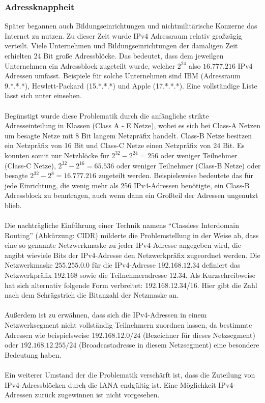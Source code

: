 \documentclass[a4paper,12pt]{scrartcl}
\begin{document}
\subsubsection{Adressknappheit}
Sp\"ater begannen auch Bildungseinrichtungen und nichtmilit\"arische Konzerne das Internet zu nutzen.
Zu dieser Zeit wurde IPv4 Adressraum relativ gro\ss{}z\"ugig verteilt. Viele Unternehmen und Bildungseinrichtungen der damaligen Zeit erhielten 24 Bit gro\ss{}e Adressbl\"ocke. Das bedeutet, dass dem jeweilgen Unternehmen ein Adressblock zugeteilt wurde, welcher $2^{24}$ also $16.777.216$ IPv4 Adressen umfasst. Beispiele f\"ur solche Unternehmen sind IBM (Adressraum 9.*.*.*), Hewlett-Packard (15.*.*.*) und Apple (17.*.*.*). Eine vollst\"andige Liste l\"asst sich unter \cite{ianaipv4list} einsehen.\\
\\
Beg\"unstigt wurde diese Problematik durch die anf\"angliche strikte Adresseinteilung in Klassen (Class A - E Netze), wobei es sich bei Class-A Netzen um besagte Netze mit 8 Bit langem Netzpr\"afix handelt. Class-B Netze besitzen ein Netzpr\"afix von 16 Bit und Class-C Netze einen Netzpr\"afix von 24 Bit. Es konnten somit nur Netzbl\"ocke f\"ur $2^{32} - 2^{24} = 256$ oder weniger Teilnehmer (Class-C Netze), $2^{32} - 2^{16} = 65.536$ oder weniger Teilnehmer (Class-B Netze) oder besagte $2^{32} - 2^{8} = 16.777.216$ zugeteilt werden. Beispielsweise bedeutete das f\"ur jede Einrichtung, die wenig mehr als 256 IPv4-Adressen ben\"otigte, ein Class-B Adressblock zu beantragen, auch wenn dann ein Gro\ss{}teil der Adressen ungenutzt blieb.\\
\\
Die nachtr\"agliche Einf\"uhrung einer Technik namens "`Classless Interdomain Routing"' (Abk\"urzung: CIDR) milderte die Problemstellung in der Weise ab, dass eine so genannte Netzwerkmaske zu jeder IPv4-Adresse angegeben wird, die angibt wieviele Bits der IPv4-Adresse den Netzwerkpr\"afix zugeordnet werden. Die Netzwerkmaske $255.255.0.0$ f\"ur die IPv4-Adresse $192.168.12.34$ definiert das Netzwerkpr\"afix $192.168$ sowie die Teilnehmeradresse $12.34$. Als Kurzschreibweise hat sich alternativ folgende Form verbreitet: 192.168.12.34/16. Hier gibt die Zahl nach dem Schr\"agstrich die Bitanzahl der Netzmaske an.\\
\\
Au\ss{}erdem ist zu erw\"ahnen, dass sich die IPv4-Adressen in einem Netzwerksegment nicht vollst\"andig Teilnehmern zuordnen lassen, da bestimmte Adressen wie beispielsweise $192.168.12.0/24$ (Bezeichner f\"ur dieses Netzsegment) oder $192.168.12.255/24$ (Broadcastadresse in diesem Netzsegment) eine besondere Bedeutung haben. \\
\\
Ein weiterer Umstand der die Problematik versch\"arft ist, dass die Zuteilung von IPv4-Adressbl\"ocken durch die IANA endg\"ultig ist. Eine M\"oglichkeit IPv4-Adressen zur\"uck zugewinnen ist nicht vorgesehen. 
\end{document}
